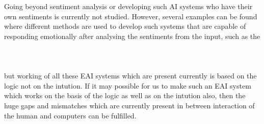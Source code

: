 Going beyond sentiment analysis or developing such AI systems who have their own sentiments is currently not studied. However, several examples can be found where different methods are used to develop such systems that are capable of responding emotionally after analysing the sentiments from the input, such as the \\\\\\\\
but working of all these EAI systems which are present currently is based on the logic not on the intution. If it may possible for us to make such an EAI system which works on the basis of the logic as well as on the intution also, then the huge gaps and mismatches which are currently present in between interaction of the human and computers can be fulfilled.